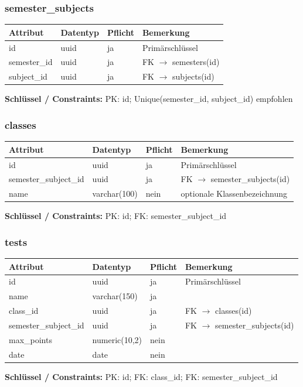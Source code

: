 \documentclass[12pt,a4paper]{article}
\begin{document}
    \subsubsection{semester\_subjects}
    \begin{longtable}{|L{4cm}|L{3cm}|L{3cm}|L{4cm}|}
        \hline
        \textbf{Attribut} & \textbf{Datentyp} & \textbf{Pflicht} & \textbf{Bemerkung} \\ \hline
        id & uuid & ja & Primärschlüssel \\ \hline
        semester\_id & uuid & ja & FK $\rightarrow$ semesters(id) \\ \hline
        subject\_id & uuid & ja & FK $\rightarrow$ subjects(id) \\ \hline
    \end{longtable}
    \textbf{Schlüssel / Constraints:} PK: id; Unique(semester\_id, subject\_id) empfohlen

    \subsubsection{classes}
    \begin{longtable}{|L{4cm}|L{3cm}|L{3cm}|L{4cm}|}
        \hline
        \textbf{Attribut} & \textbf{Datentyp} & \textbf{Pflicht} & \textbf{Bemerkung} \\ \hline
        id & uuid & ja & Primärschlüssel \\ \hline
        semester\_subject\_id & uuid & ja & FK $\rightarrow$ semester\_subjects(id) \\ \hline
        name & varchar(100) & nein & optionale Klassenbezeichnung \\ \hline
    \end{longtable}
    \textbf{Schlüssel / Constraints:} PK: id; FK: semester\_subject\_id

    \subsubsection{tests}
    \begin{longtable}{|L{4cm}|L{3cm}|L{3cm}|L{4cm}|}
        \hline
        \textbf{Attribut} & \textbf{Datentyp} & \textbf{Pflicht} & \textbf{Bemerkung} \\ \hline
        id & uuid & ja & Primärschlüssel \\ \hline
        name & varchar(150) & ja &  \\ \hline
        class\_id & uuid & ja & FK $\rightarrow$ classes(id) \\ \hline
        semester\_subject\_id & uuid & ja & FK $\rightarrow$ semester\_subjects(id) \\ \hline
        max\_points & numeric(10,2) & nein &  \\ \hline
        date & date & nein &  \\ \hline
    \end{longtable}
    \textbf{Schlüssel / Constraints:} PK: id; FK: class\_id; FK: semester\_subject\_id
\end{document}
